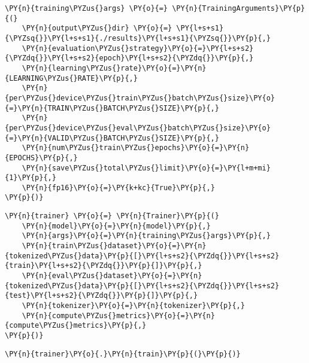 \documentclass[../main.tex]{subfiles}
\begin{document}
    \begin{tcolorbox}[breakable, size=fbox, boxrule=1pt, pad at break*=1mm,colback=cellbackground, colframe=cellborder]
\begin{Verbatim}[commandchars=\\\{\}]
\PY{n}{training\PYZus{}args} \PY{o}{=} \PY{n}{TrainingArguments}\PY{p}{(}
    \PY{n}{output\PYZus{}dir} \PY{o}{=} \PY{l+s+s1}{\PYZsq{}}\PY{l+s+s1}{./results}\PY{l+s+s1}{\PYZsq{}}\PY{p}{,}
    \PY{n}{evaluation\PYZus{}strategy}\PY{o}{=}\PY{l+s+s2}{\PYZdq{}}\PY{l+s+s2}{epoch}\PY{l+s+s2}{\PYZdq{}}\PY{p}{,}
    \PY{n}{learning\PYZus{}rate}\PY{o}{=}\PY{n}{LEARNING\PYZus{}RATE}\PY{p}{,}
    \PY{n}{per\PYZus{}device\PYZus{}train\PYZus{}batch\PYZus{}size}\PY{o}{=}\PY{n}{TRAIN\PYZus{}BATCH\PYZus{}SIZE}\PY{p}{,}
    \PY{n}{per\PYZus{}device\PYZus{}eval\PYZus{}batch\PYZus{}size}\PY{o}{=}\PY{n}{VALID\PYZus{}BATCH\PYZus{}SIZE}\PY{p}{,}
    \PY{n}{num\PYZus{}train\PYZus{}epochs}\PY{o}{=}\PY{n}{EPOCHS}\PY{p}{,}
    \PY{n}{save\PYZus{}total\PYZus{}limit}\PY{o}{=}\PY{l+m+mi}{1}\PY{p}{,}
    \PY{n}{fp16}\PY{o}{=}\PY{k+kc}{True}\PY{p}{,}
\PY{p}{)}
\end{Verbatim}
\end{tcolorbox}

    \begin{tcolorbox}[breakable, size=fbox, boxrule=1pt, pad at break*=1mm,colback=cellbackground, colframe=cellborder]
\begin{Verbatim}[commandchars=\\\{\}]
\PY{n}{trainer} \PY{o}{=} \PY{n}{Trainer}\PY{p}{(}
    \PY{n}{model}\PY{o}{=}\PY{n}{model}\PY{p}{,}
    \PY{n}{args}\PY{o}{=}\PY{n}{training\PYZus{}args}\PY{p}{,}
    \PY{n}{train\PYZus{}dataset}\PY{o}{=}\PY{n}{tokenized\PYZus{}data}\PY{p}{[}\PY{l+s+s2}{\PYZdq{}}\PY{l+s+s2}{train}\PY{l+s+s2}{\PYZdq{}}\PY{p}{]}\PY{p}{,}
    \PY{n}{eval\PYZus{}dataset}\PY{o}{=}\PY{n}{tokenized\PYZus{}data}\PY{p}{[}\PY{l+s+s2}{\PYZdq{}}\PY{l+s+s2}{test}\PY{l+s+s2}{\PYZdq{}}\PY{p}{]}\PY{p}{,}
    \PY{n}{tokenizer}\PY{o}{=}\PY{n}{tokenizer}\PY{p}{,}
    \PY{n}{compute\PYZus{}metrics}\PY{o}{=}\PY{n}{compute\PYZus{}metrics}\PY{p}{,}
\PY{p}{)}
\end{Verbatim}
\end{tcolorbox}


    \begin{tcolorbox}[breakable, size=fbox, boxrule=1pt, pad at break*=1mm,colback=cellbackground, colframe=cellborder]
\begin{Verbatim}[commandchars=\\\{\}]
\PY{n}{trainer}\PY{o}{.}\PY{n}{train}\PY{p}{(}\PY{p}{)}
\end{Verbatim}
\end{tcolorbox}
\end{document}
